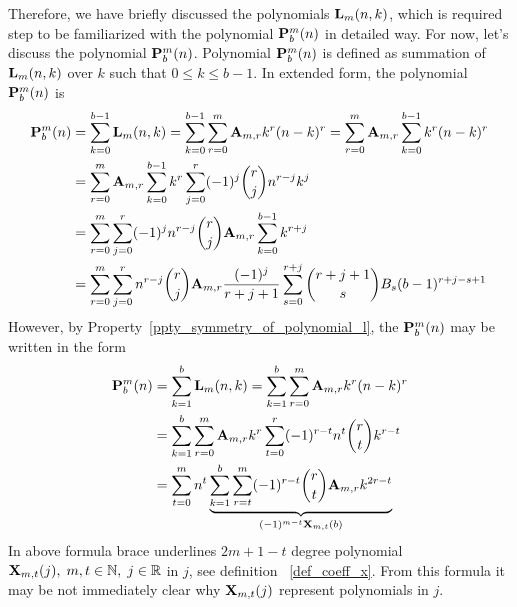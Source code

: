 \documentclass[12pt,letterpaper,oneside,reqno]{amsart}
\newcommand \bernoulli [2][B] {{#1}\sb{#2}}
\newcommand \coeffA [3][A] {{\mathbf{#1}} \sb{#2,#3}}
\newcommand \polynomialX [4][X] {{\mathbf{#1}}\sb{#2,#3} (#4)}
\newcommand \polynomialP [4][P]{{\mathbf{#1}}\sp{#2} \sb{#3}(#4)}
\newcommand \polynomialL [4][L]{{\mathbf{#1}}\sb{#2}(#3,#4)}
\numberwithin{equation}{section}
\begin{document}
    Therefore, we have briefly discussed the polynomials $\polynomialL{m}{n}{k}$, which is required step to be
    familiarized with the polynomial $\polynomialP{m}{b}{n}$ in detailed way.
    For now, let's discuss the polynomial $\polynomialP{m}{b}{n}$.
    Polynomial $\polynomialP{m}{b}{n}$ is defined as summation of $\polynomialL{m}{n}{k}$ over $k$
    such that $0\leq k \leq b-1$.
    In extended form, the polynomial $\polynomialP{m}{b}{n}$ is
    \begin{equation*}
        \begin{split}
            \polynomialP{m}{b}{n}
            &=\sum_{k=0}^{b-1} \polynomialL{m}{n}{k}
            =\sum_{k=0}^{b-1} \sum_{r=0}^{m} \coeffA{m}{r} k^r(n-k)^r
            =\sum_{r=0}^{m} \coeffA{m}{r} \sum_{k=0}^{b-1} k^r(n-k)^r \\
            &=\sum_{r=0}^{m} \coeffA{m}{r} \sum_{k=0}^{b-1} k^r \sum_{j=0}^{r} (-1)^j \binom{r}{j} n^{r-j} k^j \\
            &=\sum_{r=0}^{m} \sum_{j=0}^{r} (-1)^j n^{r-j} \binom{r}{j} \coeffA{m}{r} \sum_{k=0}^{b-1} k^{r+j} \\
            &=\sum_{r=0}^{m} \sum_{j=0}^{r} n^{r-j} \binom{r}{j} \coeffA{m}{r} \frac{(-1)^j}{r+j+1} \sum_{s=0}^{r+j}
            \binom{r+j+1}{s} \bernoulli{s} (b-1)^{r+j-s+1}
        \end{split}
    \end{equation*}
    However, by Property~\eqref{ppty_symmetry_of_polynomial_l}, the $\polynomialP{m}{b}{n}$ may be written in the form
    \begin{equation*}
        \begin{split}
            \polynomialP{m}{b}{n}
            &=\sum_{k=1}^{b} \polynomialL{m}{n}{k}
            =\sum_{k=1}^{b} \sum_{r=0}^{m} \coeffA{m}{r} k^r(n-k)^r \\
            &=\sum_{k=1}^{b} \sum_{r=0}^{m} \coeffA{m}{r} k^r \sum_{t=0}^{r} (-1)^{r-t} n^t \binom{r}{t} k^{r-t} \\
            &=\sum_{t=0}^{m} n^t \underbrace{\sum_{k=1}^{b} \sum_{r=t}^{m} (-1)^{r-t} \binom{r}{t}
                \coeffA{m}{r} k^{2r-t}}_{(-1)^{m-t} \polynomialX{m}{t}{b}}
        \end{split}
    \end{equation*}
    In above formula brace underlines $2m+1-t$ degree polynomial
    $\polynomialX{m}{t}{j}, \; m,t\in\mathbb{N}, \; j\in\mathbb{R}$ in $j$, see definition ~\eqref{def_coeff_x}.
    From this formula it may be not immediately clear why $\polynomialX{m}{t}{j}$ represent polynomials in $j$.
\end{document}
